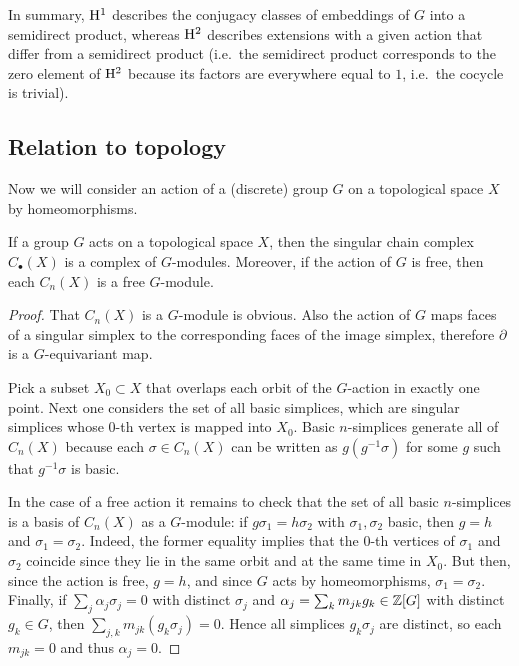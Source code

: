 In summary, $\mathrm{H}^1$ describes the conjugacy classes of embeddings of $G$ into a semidirect product, whereas $\mathrm{H}^2$ describes extensions with a given action that differ from a semidirect product (i.e.~the semidirect product corresponds to the zero element of $\mathrm{H}^2$ because its factors are everywhere equal to $1$, i.e.\ the cocycle is trivial).

\subsection{Relation to topology}

Now we will consider an action of a (discrete) group $G$
 on a topological space $X$ by homeomorphisms.

\begin{prop}
    If a group $G$ acts on a topological space $X$, then the singular chain complex $C_\bullet(X)$ is a complex of $G$-modules. Moreover, if the action of $G$ is free, then each $C_n(X)$ is a free $G$-module.
\end{prop}
\begin{proof}
    That $C_n(X)$ is a $G$-module is obvious. Also the action of $G$ maps faces of a singular simplex to the corresponding faces of the image simplex, therefore $\partial$ is a $G$-equivariant map.

    Pick a subset $X_0\subset X$ that overlaps each orbit of the $G$-action in exactly one point. Next one considers the set of all basic simplices, which are singular simplices whose $0$-th vertex is mapped into $X_0$. Basic $n$-simplices generate all of $C_n(X)$ because each $\sigma\in C_n(X)$ can be written as $g(g^{-1}\sigma)$ for some $g$ such that $g^{-1}\sigma$ is basic. 
    
    In the case of a free action it remains to check that the set of all basic $n$-simplices is a basis of $C_n(X)$ as a $G$-module: if $g\sigma_1=h\sigma_2$ with $\sigma_1,\sigma_2$ basic, then $g=h$ and $\sigma_1=\sigma_2$. Indeed, the  former equality implies that the $0$-th vertices of $\sigma_1$ and $\sigma_2$ coincide since they lie in the same orbit and at the same time in $X_0$. But then, since the action is free, $g=h$, and since $G$ acts by homeomorphisms, $\sigma_1=\sigma_2$. Finally, if $\sum_j\alpha_j\sigma_j=0$ with distinct $\sigma_j$ and $\alpha_j=\sum_km_{jk}g_k\in \mathbb{Z}[G]$ with distinct $g_k\in G$, then $\sum_{j,k}m_{jk}(g_k \sigma_j)=0$. Hence all simplices $g_k\sigma_j$ are distinct, so each $m_{jk}=0$ and thus $\alpha_j=0$.
\end{proof}

